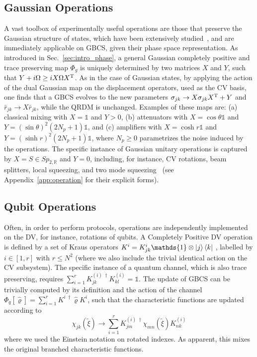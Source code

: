 \documentclass[%
reprint,
superscriptaddress,
nofootinbib,
 amsmath,amssymb,
prx,
floatfix,
]{revtex4-2}
\begin{document}
\subsection{Gaussian Operations \label{subsec:gaussian_operations}}

A vast toolbox of experimentally useful operations are those that preserve the Gaussian structure of states, which have been extensively studied~\cite{serafini_quantum_2017}, and are immediately applicable on GBCS, given their phase space representation. As introduced in Sec.~\ref{sec:intro_phase}, a general Gaussian completely positive and trace preserving map $\Phi_g$ is uniquely determined by two matrices $X$ and $Y$, such that $Y+ i \Omega \geq i X \Omega X^{\rm T}$. As in the case of Gaussian states, by applying the action of the dual Gaussian map on the displacement operators, used as the CV basis, one finds that a GBCS evolves to the new parameters $\sigma_{jk} \to X  \sigma_{jk} X^{ {\rm T}} + Y$ and $
    \bar{r}_{jk}  \to X \bar{r}_{jk}$, while the QRDM is unchanged. 
Examples of these maps are: (a) classical mixing with $X= \mathds{1}$ and $Y >0 $, (b) attenuators with $X = \cos \theta \mathds{1}$ and $Y = (\sin \theta)^2 (2 N_p + 1) \mathds{1}$, and (c) amplifiers with $X = \cosh r \mathds{1}$ and $Y = (\sinh r)^2 (2 N_p + 1) \mathds{1}$, where $N_p\ge0$ parametrizes the noise induced by the operations. The specific instance of Gaussian unitary operations is captured by $X = S \in Sp_{2, \mathds{R}}$ and $Y = 0$, including, for instance, CV rotations, beam splitters, local squeezing, and two mode squeezing~\cite{serafini_quantum_2017} (see Appendix~\ref{app:operation} for their explicit forms). 

\subsection{Qubit Operations}

Often, in order to perform protocols, operations are independently implemented on the DV, for instance, rotations of qubits. A Completely Positive DV operation is defined by a set of Kraus operators $K^i = K^i_{jk} \mathds{1} \otimes \ket{j}\bra{k}$ , labelled by $ i \in [1, r]$ with $r \leq N^2$ (where we also include the trivial identical action on the CV subsystem). The specific instance of a quantum channel, which is also trace preserving, requires $\sum_{i = 1}^{r}  K^{(i) \;\dag}_{jk} K^{(i)}_{kl} = \mathds{1}$. The update of GBCS can be trivially computed by its definition and the action of the channel $\Phi_{q} [\hat{\varrho}] = \sum_{i = 1}^{r}  K^{i \; \dag} \hat{\varrho} K^i$, such that the characteristic functions are updated according to 
\begin{equation}
    \chi_{jk} (\tilde{\xi})\to \sum_{i = 1}^{r}  K^{(i) \;\dag}_{jm}  \chi_{m n}(\tilde{\xi}) K^{(i)}_{n k} 
\end{equation}
where we used the Einstein notation on rotated indexes. As apparent, this mixes the original branched characteristic functions.
\end{document}
